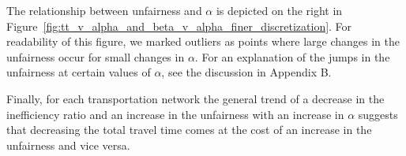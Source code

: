\documentclass{article}
\newif\ifarxiv   %
\begin{document}
The relationship between unfairness and %
$\alpha$ is depicted on the right in Figure~\ref{fig:tt_v_alpha_and_beta_v_alpha_finer_discretization}. For readability of this figure, we marked outliers as points where large changes in the unfairness occur for small changes in $\alpha$. %
For an explanation of the jumps in the unfairness at certain values of $\alpha$, see the discussion in \ifarxiv Section~\ref{sec:solution-properties}\else Appendix B\fi.

Finally, for each transportation network the general trend of a decrease in the inefficiency ratio and an increase in the unfairness with an increase in $\alpha$ suggests that decreasing the total travel time comes at the cost of an increase in the unfairness and vice versa.


\end{document}
